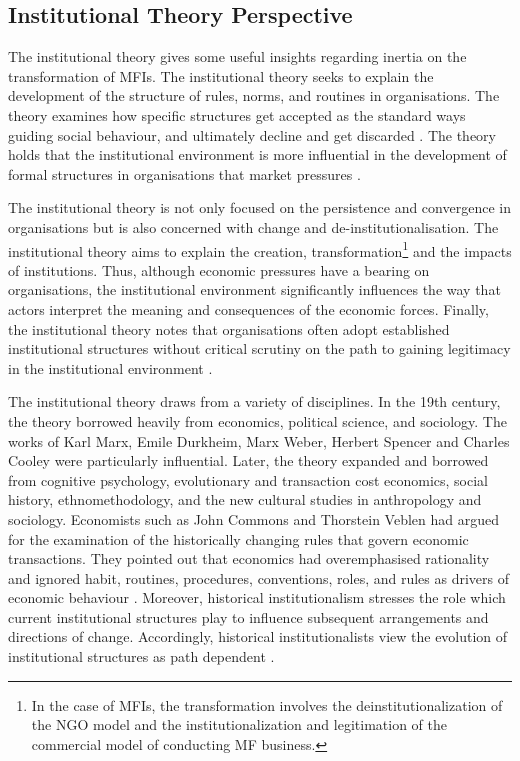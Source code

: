 \documentclass[a4paper,nobind]{templates/ociamthesis}
\begin{document}
\hypertarget{institutional-theory-perspective}{%
\subsection{Institutional Theory Perspective}\label{institutional-theory-perspective}}

\noindent The institutional theory gives some useful insights regarding inertia on the transformation of MFIs. The institutional theory seeks to explain the development of the structure of rules, norms, and routines in organisations. The theory examines how specific structures get accepted as the standard ways guiding social behaviour, and ultimately decline and get discarded \autocite{scott2005institutional}. The theory holds that the institutional environment is more influential in the development of formal structures in organisations that market pressures \autocite{powell2012new}.

The institutional theory is not only focused on the persistence and convergence in organisations but is also concerned with change and de-institutionalisation. The institutional theory aims to explain the creation, transformation\footnote{In the case of MFIs, the transformation involves the deinstitutionalization of the NGO model and the institutionalization and legitimation of the commercial model of conducting MF business.} and the impacts of institutions\autocite{powell2012new}. Thus, although economic pressures have a bearing on organisations, the institutional environment significantly influences the way that actors interpret the meaning and consequences of the economic forces. Finally, the institutional theory notes that organisations often adopt established institutional structures without critical scrutiny on the path to gaining legitimacy in the institutional environment \autocite{tina2002institutional}.

The institutional theory draws from a variety of disciplines. In the 19th century, the theory borrowed heavily from economics, political science, and sociology. The works of Karl Marx, Emile Durkheim, Marx Weber, Herbert Spencer and Charles Cooley were particularly influential. Later, the theory expanded and borrowed from cognitive psychology, evolutionary and transaction cost economics, social history, ethnomethodology, and the new cultural studies in anthropology and sociology. Economists such as John Commons and Thorstein Veblen had argued for the examination of the historically changing rules that govern economic transactions. They pointed out that economics had overemphasised rationality and ignored habit, routines, procedures, conventions, roles, and rules as drivers of economic behaviour \autocite{scott2005institutional}. Moreover, historical institutionalism stresses the role which current institutional structures play to influence subsequent arrangements and directions of change. Accordingly, historical institutionalists view the evolution of institutional structures as path dependent \autocite{tina2002institutional}.
\end{document}
